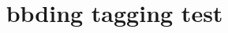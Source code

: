 \documentclass{article}
\title{bbding tagging test}
\begin{document}
\ScissorRight

\PlusCenterOpen

\SixFlowerRemovedOpenPetal
\end{document}
